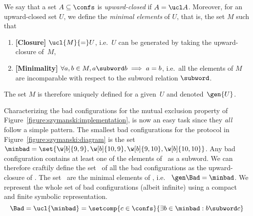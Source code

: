 We say that a set $A\subseteq\confs$ is \emph{upward-closed} if $A =
\ucl A$.
%
%
%
%
%
Moreover, for an upward-closed set $U$, we define the \emph{minimal
  elements} of $U$, that is, the set $M$ such that
\begin{enumerate}[label=(\roman*),leftmargin=0pt]
\item %
  \textbf{[Closure]} $\ucl{M}{=}U$, i.e.\ $U$ can be generated by taking
  the upward-closure of~$M$,
\item %
  \textbf{[Minimality]} $\forall a,b\in M, a\subword b \implies a=b$,
  i.e.\ all the elements of $M$ are incomparable with respect to the
  subword relation $\subword$.
\end{enumerate}
% 
The set $M$ is therefore uniquely defined for a given~$U$ and
denoted~$\gen{U}$.


%
%
Characterizing the bad configurations for the mutual exclusion
property of Figure~\ref{figure:szymanski:implementation}, is now an
easy task since they \emph{all} follow a simple pattern.
%
The smallest bad configurations for the protocol in
Figure~\ref{figure:szymanski:diagram} is the %
set $\minbad = \set{\w[b]{9,9}, \w[b]{10,9}, \w[b]{9,10},
  \w[b]{10,10}}$.
%
Any bad configuration contains at least one of the elements of
\minbad\ as a subword. We can therefore craftily define the set \Bad\
of all the bad configurations as the upward-closure of {\minbad}.
%
The set \minbad\ are the minimal elements of {\Bad}, i.e.\ %
$\gen\Bad=\minbad$.
%
%
We represent the whole set of bad configurations (albeit infinite)
using a compact and finite symbolic representation.
%
$$\Bad = \ucl{\minbad} = \setcomp{c\in\confs}{\exists b\in\minbad : b\subword c}$$


